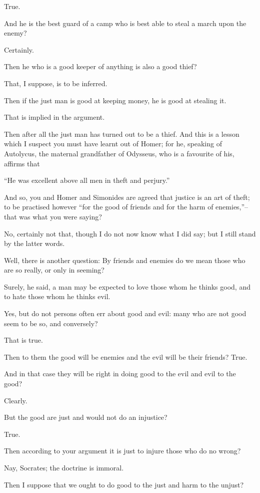 True.

And he is the best guard of a camp who is best able to steal a march
upon the enemy?

Certainly.

Then he who is a good keeper of anything is also a good thief?

That, I suppose, is to be inferred.

Then if the just man is good at keeping money, he is good at stealing
it.

That is implied in the argument.

Then after all the just man has turned out to be a thief. And this is
a lesson which I suspect you must have learnt out of Homer; for he,
speaking of Autolycus, the maternal grandfather of Odysseus, who is a
favourite of his, affirms that

``He was excellent above all men in theft and perjury.''

And so, you and Homer and Simonides are agreed that justice is an art of
theft; to be practised however ``for the good of friends and for the harm
of enemies,''--that was what you were saying?

No, certainly not that, though I do not now know what I did say; but I
still stand by the latter words.

Well, there is another question: By friends and enemies do we mean those
who are so really, or only in seeming?

Surely, he said, a man may be expected to love those whom he thinks
good, and to hate those whom he thinks evil.

Yes, but do not persons often err about good and evil: many who are not
good seem to be so, and conversely?

That is true.

Then to them the good will be enemies and the evil will be their
friends? True.

And in that case they will be right in doing good to the evil and evil
to the good?

Clearly.

But the good are just and would not do an injustice?

True.

Then according to your argument it is just to injure those who do no
wrong?

Nay, Socrates; the doctrine is immoral.

Then I suppose that we ought to do good to the just and harm to the
unjust?

